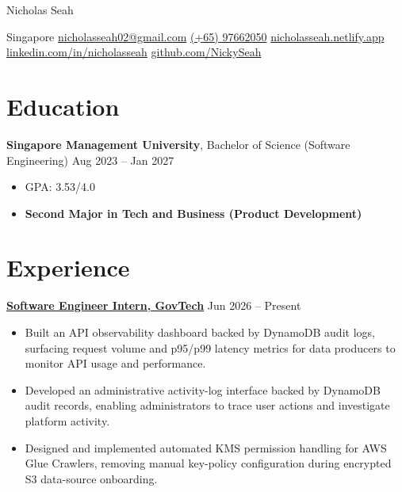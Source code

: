 \documentclass[10pt, letterpaper]{article}
\newenvironment{resumeitemize}{
    \begin{itemize}[
        leftmargin=1.15em,
        itemsep=0.12em,
        topsep=0.12em,
        parsep=0.04em,
        partopsep=0pt
    ]
}{
    \end{itemize}
}
\begin{document}
\begin{center}
    {\LARGE Nicholas Seah\par}
    \vspace{0.3em}
    Singapore \textbar{} \href{mailto:nicholasseah02@gmail.com}{nicholasseah02@gmail.com} \textbar{} \href{tel:+6597662050}{(+65) 97662050} \textbar{} \href{https://nicholasseah.netlify.app/}{nicholasseah.netlify.app} \textbar{} \href{https://linkedin.com/in/nicholasseah}{linkedin.com/in/nicholasseah} \textbar{} \href{https://github.com/NickySeah}{github.com/NickySeah}
\end{center}


\vspace{0.10em}

\section{Education}

\textbf{Singapore Management University}, Bachelor of Science (Software Engineering) \hfill Aug 2023 -- Jan 2027

\begin{resumeitemize}
    \item GPA: 3.53/4.0
    \item \textbf{Second Major in Tech and Business (Product Development)}
\end{resumeitemize}

\section{Experience}

\href{https://www.tech.gov.sg/}{\textbf{Software Engineer Intern, GovTech}} \hfill Jun 2026 -- Present

\begin{resumeitemize}
    \item Built an API observability dashboard backed by DynamoDB audit logs, surfacing request volume and p95/p99 latency metrics for data producers to monitor API usage and performance.
    \item Developed an administrative activity-log interface backed by DynamoDB audit records, enabling administrators to trace user actions and investigate platform activity.
    \item Designed and implemented automated KMS permission handling for AWS Glue Crawlers, removing manual key-policy configuration during encrypted S3 data-source onboarding.
\end{resumeitemize}
\end{document}
